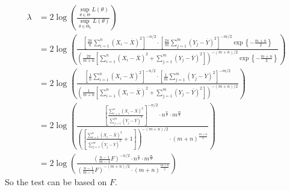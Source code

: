 \[
\begin{aligned}
\lambda & =2\log \left( \frac{\sup_{\theta\in\Theta}L(\theta)}{\sup_{\theta\in\Theta_0}L(\theta)} \right) \\
 & =2\log\left( \frac{\left[ \frac{2\pi}{n}\sum_{i=1}^{n} (X_i-\overline{X})^2 \right]^{-n/2 }\cdot\left[ \frac{2\pi}{m}\sum_{j=1}^{m} (Y_j-\overline{Y})^2 \right]^{-m/2 }\exp \left\{  -\frac{m+n}{2}  \right\}}{\left( \frac{2\pi}{m+n}\left[ \sum_{i=1}^{n} (X_i-\overline{X})^2 +\sum_{j=1}^{m} (Y_j-\overline{Y})^2\right] \right)^{-(m+n)/2 }\exp \left\{  -\frac{m+n}{2}  \right\}} \right) \\
 & =2\log\left( \frac{\left[ \frac{1}{n}\sum_{i=1}^{n} (X_i-\overline{X})^2 \right]^{-n/2 }\cdot\left[ \frac{1}{m}\sum_{j=1}^{m} (Y_j-\overline{Y})^2 \right]^{-m/2 }}{\left( \frac{1}{m+n}\left[ \sum_{i=1}^{n} (X_i-\overline{X})^2 +\sum_{j=1}^{m} (Y_j-\overline{Y})^2\right] \right)^{-(m+n)/2 }} \right)  \\
 & =2\log\left( \frac{\left[ \frac{\sum_{i=1}^{n} (X_i-\overline{X})^2}{\sum_{j=1}^{m} (Y_j-\overline{Y})^2}  \right]^{-n/2 }\cdot n^{\frac{n}{2}}\cdot m^{\frac{m}{2}}}{\left( \left[ \frac{\sum_{i=1}^{n} (X_i-\overline{X})^2}{\sum_{j=1}^{m} (Y_j-\overline{Y})^2}+1\right] \right)^{-(m+n)/2 }\cdot(m+n)^{\frac{m+n}{2}}} \right) \\
 & =2\log\left( \frac{(\frac{n-1}{m-1}F)^{-n/2 }\cdot n^{\frac{n}{2}}\cdot m^{\frac{m}{2}}}{\left( \frac{n-1}{m-1}F \right)^{-(m+n)/2 }\cdot(m+n)^{\frac{m+n}{2}}} \right)
\end{aligned}
\]
So the test can be based on $F$.

